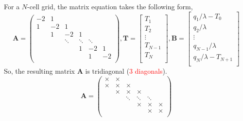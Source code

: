 \documentclass[12pt]{amsart}   %
\begin{document}
For a $N$-cell grid, the matrix equation takes the following form, 
\begin{equation}
\textbf{A}=\begin{pmatrix}
-2 & 1 & & &&\\
1 & -2 & 1 && & \\
& 1 & -2 & 1 && \\
&  & \ddots & \ddots & \ddots& \\
&   && 1 &-2 &1\\
&   & & &1 &-2\\
\end{pmatrix}, \textbf{T}=\begin{bmatrix}
{T_{1}}\\
{T_{2}}\\
\vdots\\
{T_{N-1}}\\
{T_{N}}\\
\end{bmatrix}, \textbf{B}=\begin{bmatrix}
{q_{1}}/{\lambda}-T_{0}\\
{q_{2}}/{\lambda}\\
\vdots\\
{q_{N-1}}/{\lambda}\\
{q_{N}}/{\lambda}-T_{N+1}\\
\end{bmatrix}
\end{equation}
So, the resulting matrix \textbf{A} is tridiagonal (\textcolor{red}{3 diagonals}).
\begin{equation}
\textbf{A}=\begin{pmatrix}
\times & \times & & &&\\
\times & \times & \times && & \\
& \times & \times & \times && \\
&  & \ddots & \ddots & \ddots& \\
&   && \times & \times &\times\\
&   & & &\times &\times\\
\end{pmatrix}\end{equation}
\end{document}
